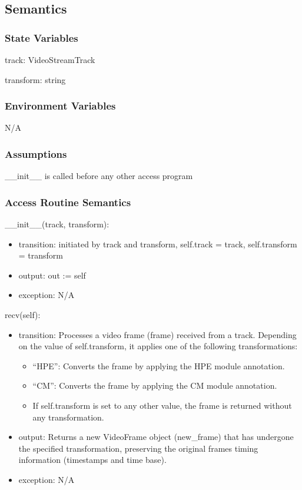 \documentclass[12pt, titlepage]{article}
\begin{document}
\subsection{Semantics}

\subsubsection{State Variables}

track: VideoStreamTrack

transform: string

\subsubsection{Environment Variables}
N/A

\subsubsection{Assumptions}
\_\_init\_\_ is called before any other access program

\subsubsection{Access Routine Semantics}

\noindent \_\_init\_\_(track, transform):
\begin{itemize}
  \item transition: initiated by track and transform, self.track = track, self.transform = transform
  \item output: out := self
  \item exception: N/A
\end{itemize}

\noindent recv(self):
\begin{itemize}
\item transition: Processes a video frame (frame) received from a track. Depending
  on the value of self.transform, it applies one of the following
  transformations:
  \begin{itemize}
  \item ``HPE'': Converts the frame by applying the HPE module
    annotation.
  \item ``CM'': Converts the frame by applying the CM module annotation.
  \item If self.transform is set to any other value, the frame is returned without any
    transformation.
  \end{itemize}
\item output: Returns a new VideoFrame object (new\_frame) that has undergone the
  specified transformation, preserving the original frames timing information
  (timestamps and time base).
  \item exception: N/A
\end{itemize}
\end{document}
